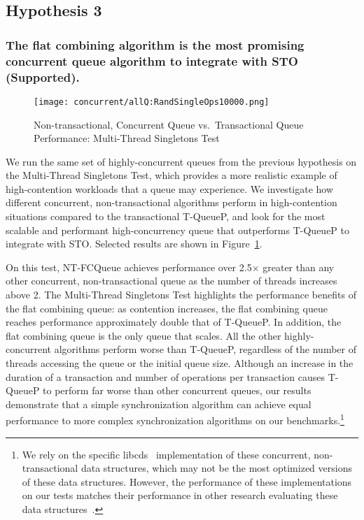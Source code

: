 \subsection{Hypothesis 3}
\subsubsection{The flat combining algorithm is the most promising concurrent queue algorithm to integrate with STO (Supported).}
\label{eval:hypo3}

\begin{figure}[t!]
    \centering
   	\begin{minipage}{\textwidth}
        {\texttt{[image: concurrent/allQ:RandSingleOps10000.png]}}
	\end{minipage}
    \caption{Non-transactional, Concurrent Queue vs.\ Transactional Queue Performance: Multi-Thread Singletons Test}
    \label{fig:ntqs}
\end{figure}

We run the same set of highly-concurrent queues from the previous hypothesis on the Multi-Thread Singletons Test, which provides a more realistic example of high-contention workloads that a queue may experience. We investigate how different concurrent, non-transactional algorithms perform in high-contention situations compared to the transactional T-QueueP, and look for the most scalable and performant high-concurrency queue that outperforms T-QueueP to integrate with STO. Selected results are shown in Figure~\ref{fig:ntqs}.

On this test, NT-FCQueue achieves performance over 2.5$\times$ greater than any other concurrent, non-transactional queue as the number of threads increases above 2. The Multi-Thread Singletons Test highlights the performance benefits of the flat combining queue: as contention increases, the flat combining queue reaches performance approximately double that of T-QueueP. In addition, the flat combining queue is the only queue that scales. All the other highly-concurrent algorithms perform worse than T-QueueP, regardless of the number of threads accessing the queue or the initial queue size. 
Although an increase in the duration of a transaction and number of operations per transaction causes T-QueueP to perform far worse than other concurrent queues, our results demonstrate that a simple synchronization algorithm can achieve equal performance to more complex synchronization algorithms on our benchmarks.\footnote{We rely on the specific libcds~\cite{libcds} implementation of these concurrent, non-transactional data structures, which may not be the most optimized versions of these data structures. However, the performance of these implementations on our tests matches their performance in other research evaluating these data structures~\cite{queue1, queue3}.}

